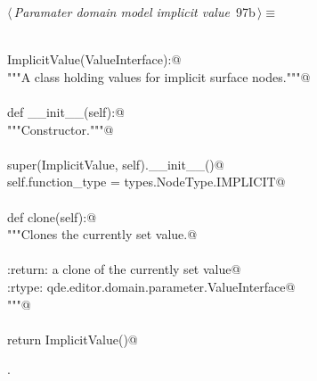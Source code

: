 \documentclass[
    a4paper,      %
    10pt,         %
    openright,    %
    notitlepage,  %
    parskip=half, %
]{scrreprt}       %
\theoremstyle{definition}                    %
\begin{document}
\begin{flushleft} \small
\begin{minipage}{\linewidth}\label{scrap156}\raggedright\small
{} $\langle\,${\itshape Paramater domain model implicit value}\nobreak\ {\footnotesize {97b}}$\,\rangle\equiv$
\vspace{-1exm}
\begin{list}{}{} \item
\mbox{}\lstinline@@\\
\mbox{}\lstinline@class ImplicitValue(ValueInterface):@\\
\mbox{}\lstinline@    """A class holding values for implicit surface nodes."""@\\
\mbox{}\lstinline@@\\
\mbox{}\lstinline@    def __init__(self):@\\
\mbox{}\lstinline@        """Constructor."""@\\
\mbox{}\lstinline@@\\
\mbox{}\lstinline@        super(ImplicitValue, self).__init__()@\\
\mbox{}\lstinline@        self.function_type = types.NodeType.IMPLICIT@\\
\mbox{}\lstinline@@\\
\mbox{}\lstinline@    def clone(self):@\\
\mbox{}\lstinline@        """Clones the currently set value.@\\
\mbox{}\lstinline@@\\
\mbox{}\lstinline@        :return: a clone of the currently set value@\\
\mbox{}\lstinline@        :rtype:  qde.editor.domain.parameter.ValueInterface@\\
\mbox{}\lstinline@        """@\\
\mbox{}\lstinline@@\\
\mbox{}\lstinline@        return ImplicitValue()@{\NWsep}
\end{list}
\vspace{-1.5ex}
\footnotesize
\begin{list}{}{\setlength{\itemsep}{-\parsep}\setlength{\itemindent}{-\leftmargin}}
\item {\NWtxtMacroNoRef}.

\item{}
\end{list}
\end{minipage}\vspace{4ex}
\end{flushleft}
\end{document}
